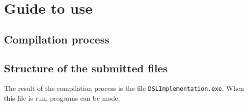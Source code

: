 \section{Guide to use}
\subsection{Compilation process}

\subsection{Structure of the submitted files}
The result of the compilation process is the file \texttt{DSLImplementation.exe}. When this file is run, programs can be made.